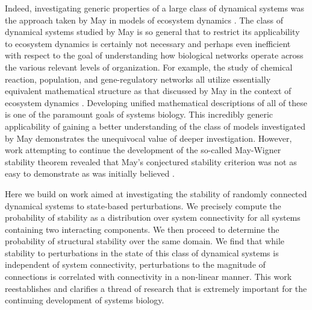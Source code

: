 Indeed, investigating generic properties of a large class of dynamical systems was the approach taken by May in models of ecosystem dynamics \cite{Gardner1970,May1972}. The class of dynamical systems studied by May is so general that to restrict its applicability to ecosystem dynamics is certainly not necessary and perhaps even inefficient with respect to the goal of understanding how biological networks operate across the various relevant levels of organization. For example, the study of chemical reaction, population, and gene-regulatory networks all utilize essentially equivalent mathematical structure as that discussed by May in the context of ecosystem dynamics \cite{RossCr2003,Alon2006,Palsson2006,HamidBolouri2008,Palsson2011a,Voit2012,Sauro2012}. Developing unified mathematical descriptions of all of these is one of the paramount goals of systems biology. This incredibly generic applicability of gaining a better understanding of the class of models investigated by May demonstrates the unequivocal value of deeper investigation.  However, work attempting to continue the development of the so-called May-Wigner stability theorem revealed that May's conjectured stability criterion was not as easy to demonstrate as was initially believed \cite{Cohen1984,May1972a,Radius2014}.

Here we build on work aimed at investigating the stability of randomly connected dynamical systems to state-based perturbations. We precisely compute the probability of stability as a distribution over system connectivity for all systems containing two interacting components. We then proceed to determine the probability of structural stability over the same domain. We find that while stability to perturbations in the state of this class of dynamical systems is independent of system connectivity, perturbations to the magnitude of connections is correlated with connectivity in a non-linear manner. This work reestablishes and clarifies a thread of research that is extremely important for the continuing development of systems biology.

